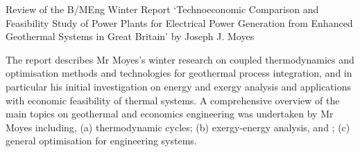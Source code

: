 \documentclass[14pt,twoside]{report}
\begin{document}
\bigskip

\begin{center}
  {\Large Review of the B/MEng Winter Report `Technoeconomic Comparison and Feasibility Study of Power Plants for Electrical Power Generation from Enhanced Geothermal Systems in Great Britain' by Joseph J. Moyes}
\end{center}


The report describes Mr Moyes's winter research on coupled thermodynamics and optimisation methods and technologies for geothermal process integration, and in particular his initial investigation on energy and exergy analysis and applications with economic feasibility of thermal systems. A comprehensive overview of the main topics on geothermal and economics engineering was undertaken by Mr Moyes including, (a) thermodynamic cycles; (b) exergy-energy analysis, and ; (c) general optimisation for engineering systems.  
\end{document}
